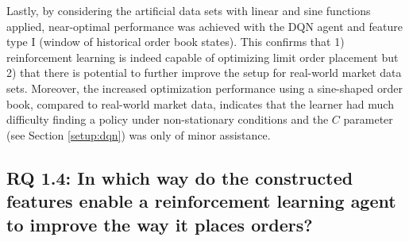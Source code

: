     Lastly, by considering the artificial data sets with linear and sine functions applied, near-optimal performance was achieved with the DQN agent and feature type I (window of historical order book states).
    This confirms that 1) reinforcement learning is indeed capable of optimizing limit order placement but 2) that there is potential to further improve the setup for real-world market data sets.
    Moreover, the increased optimization performance using a sine-shaped order book, compared to real-world market data, indicates that the learner had much difficulty finding a policy under non-stationary conditions and the $C$ parameter (see Section \ref{setup:dqn}) was only of minor assistance.
    
\subsection{RQ 1.4: In which way do the constructed features enable a reinforcement learning agent to improve the way it places orders?}

